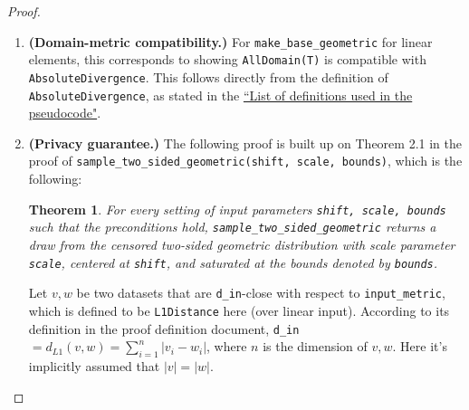 \documentclass[11pt,a4paper]{article}
\newtheorem{theorem}{Theorem}[section]
\newtheorem{lemma}[theorem]{Lemma}
\newcommand{\vicki}[1]{{ {\color{olive}{(vicki)~#1}}}}
\newcommand{\hanwen}[1]{{ {\color{purple}{(hanwen)~#1}}}}
\begin{document}
\begin{proof}
\begin{enumerate}
    \item \textbf{(Domain-metric compatibility.)} For \texttt{make\_base\_geometric} for linear elements, this corresponds to showing \texttt{AllDomain(T)} is compatible with \texttt{AbsoluteDivergence}. This follows directly from the definition of \texttt{AbsoluteDivergence}, as stated in the \href{https://github.com/opendp/whitepapers/blob/pseudocode-defns/pseudocode-defns/pseudocode_defns.pdf}{``List of definitions used in the pseudocode"}.
    \item \textbf{(Privacy guarantee.)} 
    The following proof is built up on Theorem 2.1 in the proof
    of \texttt{sample\_two\_sided\_geometric(shift, scale, bounds)}, which is the following: \hanwen{link to be put here}
    
    \begin{tcolorbox}
    \begin{theorem}
     For every setting of input parameters \texttt{shift, scale, bounds} such that the preconditions hold, \texttt{sample\_two\_sided\_geometric} returns a draw from the censored two-sided geometric distribution with scale parameter \texttt{scale}, centered at \texttt{shift}, and saturated at the bounds denoted by \texttt{bounds}. 
    \end{theorem}

    \end{tcolorbox}
    Let $v,w$ be two datasets that are \texttt{d\_in}-close with respect to \texttt{input\_metric}, which is defined to be
    \texttt{L1Distance} here (over linear input). According to its definition 
    in the proof definition document, \texttt{d\_in}$=d_{L1}(v,w)=\sum ^n_{i=1}|v_i-w_i|$,
    where $n$ is the dimension of $v,w$.
    Here it's implicitly assumed that $|v|=|w|$.
    

\end{enumerate}
\end{proof}
\end{document}
